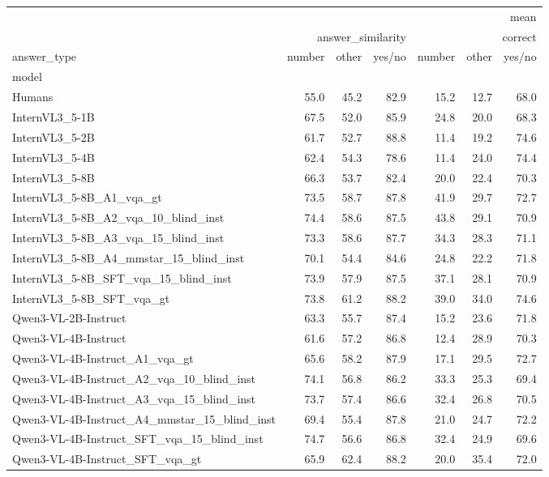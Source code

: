 \begin{tabular}{lrrrrrr}
\toprule
 & \multicolumn{6}{r}{mean} \\
 & \multicolumn{3}{r}{answer_similarity} & \multicolumn{3}{r}{correct} \\
answer_type & number & other & yes/no & number & other & yes/no \\
model &  &  &  &  &  &  \\
\midrule
Humans & 55.0 & 45.2 & 82.9 & 15.2 & 12.7 & 68.0 \\
InternVL3_5-1B & 67.5 & 52.0 & 85.9 & 24.8 & 20.0 & 68.3 \\
InternVL3_5-2B & 61.7 & 52.7 & 88.8 & 11.4 & 19.2 & 74.6 \\
InternVL3_5-4B & 62.4 & 54.3 & 78.6 & 11.4 & 24.0 & 74.4 \\
InternVL3_5-8B & 66.3 & 53.7 & 82.4 & 20.0 & 22.4 & 70.3 \\
InternVL3_5-8B_A1_vqa_gt & 73.5 & 58.7 & 87.8 & 41.9 & 29.7 & 72.7 \\
InternVL3_5-8B_A2_vqa_10_blind_inst & 74.4 & 58.6 & 87.5 & 43.8 & 29.1 & 70.9 \\
InternVL3_5-8B_A3_vqa_15_blind_inst & 73.3 & 58.6 & 87.7 & 34.3 & 28.3 & 71.1 \\
InternVL3_5-8B_A4_mmstar_15_blind_inst & 70.1 & 54.4 & 84.6 & 24.8 & 22.2 & 71.8 \\
InternVL3_5-8B_SFT_vqa_15_blind_inst & 73.9 & 57.9 & 87.5 & 37.1 & 28.1 & 70.9 \\
InternVL3_5-8B_SFT_vqa_gt & 73.8 & 61.2 & 88.2 & 39.0 & 34.0 & 74.6 \\
Qwen3-VL-2B-Instruct & 63.3 & 55.7 & 87.4 & 15.2 & 23.6 & 71.8 \\
Qwen3-VL-4B-Instruct & 61.6 & 57.2 & 86.8 & 12.4 & 28.9 & 70.3 \\
Qwen3-VL-4B-Instruct_A1_vqa_gt & 65.6 & 58.2 & 87.9 & 17.1 & 29.5 & 72.7 \\
Qwen3-VL-4B-Instruct_A2_vqa_10_blind_inst & 74.1 & 56.8 & 86.2 & 33.3 & 25.3 & 69.4 \\
Qwen3-VL-4B-Instruct_A3_vqa_15_blind_inst & 73.7 & 57.4 & 86.6 & 32.4 & 26.8 & 70.5 \\
Qwen3-VL-4B-Instruct_A4_mmstar_15_blind_inst & 69.4 & 55.4 & 87.8 & 21.0 & 24.7 & 72.2 \\
Qwen3-VL-4B-Instruct_SFT_vqa_15_blind_inst & 74.7 & 56.6 & 86.8 & 32.4 & 24.9 & 69.6 \\
Qwen3-VL-4B-Instruct_SFT_vqa_gt & 65.9 & 62.4 & 88.2 & 20.0 & 35.4 & 72.0 \\

\end{tabular}
